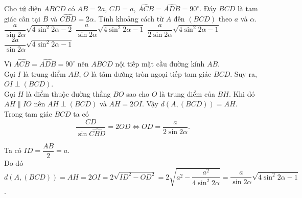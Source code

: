 \begin{ex}%
 Cho tứ diện $ABCD$ có $AB=2a$, $CD=a$, $\widehat{ACB}=\widehat{ADB}=90^\circ$. Đáy $BCD$ là tam giác cân tại $B$ và $\widehat{CBD}=2\alpha$. Tính khoảng cách từ $A$ đến $(BCD)$ theo $a$ và $\alpha$.
 \choice
  {$\dfrac{a}{\sin2\alpha}\sqrt{4\sin^2 2\alpha - 2}$}
  {\True $\dfrac{a}{\sin2\alpha}\sqrt{4\sin^2 2\alpha - 1}$}
  {$\dfrac{a}{2\sin2\alpha}\sqrt{4\sin^2 2\alpha - 1}$}
  {$\dfrac{2a}{\sin2\alpha}\sqrt{4\sin^2 2\alpha - 1}$}
 \loigiai
  {
  \immini
  {
  Vì $\widehat{ACB}=\widehat{ADB}=90^\circ$ nên $ABCD$ nội tiếp mặt cầu đường kính $AB$.\\
  Gọi $I$ là trung điểm $AB$, $O$ là tâm đường tròn ngoại tiếp tam giác $BCD$. Suy ra, $OI \perp (BCD)$.\\
  Gọi $H$ là điểm thuộc đường thẳng $BO$ sao cho $O$ là trung điểm của $BH$. Khi đó $AH \parallel IO$ nên $AH \perp (BCD)$ và $AH = 2OI$. Vậy $d(A,(BCD)) = AH$.\\
  Trong tam giác $BCD$ ta có
  $$\dfrac{CD}{\sin\widehat{CBD}} = 2OD \Leftrightarrow OD = \dfrac{a}{2\sin 2\alpha}.$$
  }
  {
  }
  \noindent
  Ta có $ID = \dfrac{AB}{2} = a$.\\
  Do đó $d(A,(BCD)) = AH = 2OI = 2\sqrt{ID^2 - OD^2} = 2 \sqrt{a^2 - \dfrac{a^2}{4\sin^2 2\alpha}} = \dfrac{a}{\sin2\alpha}\sqrt{4\sin^2 2\alpha - 1}$.
  }
\end{ex}


